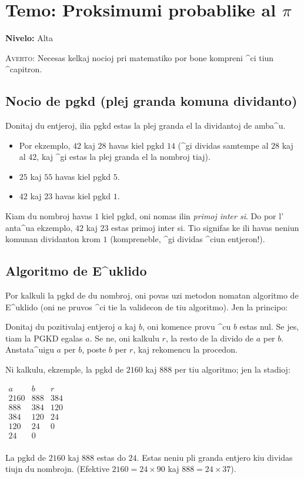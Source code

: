 \chapter{Temo: Proksimumi probablike al $\pi$}

{ }\hfill\textbf{Nivelo:} Alta

\textsc{Averto:} Necesas kelkaj nocioj pri matematiko por bone
kompreni ^ci tiun ^capitron.

\section{Nocio de pgkd (plej granda komuna dividanto)}

Donitaj du entjeroj, ilia pgkd estas la plej granda el la dividantoj
de amba^u.
\begin{itemize}
\item Por ekzemplo, $42$ kaj $28$ havas kiel pgkd $14$ (^gi dividas
  samtempe al $28$ kaj al $42$, kaj ^gi estas la plej granda el la
  nombroj tiaj).
\item $25$ kaj $55$ havas kiel pgkd $5$.
\item $42$ kaj $23$ havas kiel pgkd $1$.
\end{itemize}
Kiam du nombroj havas $1$ kiel pgkd, oni nomas ilin \emph{primoj inter
  si}.  Do por l' anta^ua ekzemplo, $42$ kaj $23$ estas primoj inter
si.  Tio signifas ke ili havas neniun komunan dividanton krom $1$
(kompreneble, ^gi dividas ^ciun entjeron!).

\section{Algoritmo de E^uklido}

Por kalkuli la pgkd de du nombroj, oni povas uzi metodon nomatan
algoritmo de E^uklido (oni ne pruvos ^ci tie la validecon de tiu
algoritmo).  Jen la principo:

Donitaj du pozitivalaj entjeroj $a$ kaj $b$, oni komence provu ^cu $b$
estas nul.  Se jes, tiam la PGKD egalas $a$.  Se ne, oni kalkulu $r$,
la resto de la divido de $a$ per $b$.  Anstata^uigu $a$ per $b$, poste
$b$ per $r$, kaj rekomencu la procedon.

Ni kalkulu, ekzemple, la pgkd de $2160$ kaj $888$ per tiu algoritmo;
jen la stadioj:
\begin{center}
$\begin{array}{ccc}
a & b & r\\
2160 & 888 & 384 \\
888 & 384 & 120 \\
384 & 120 & 24 \\
120 & 24 & 0 \\
24 & 0 & \\
\end{array}$
\end{center}
La pgkd de $2160$ kaj $888$ estas do $24$.  Estas neniu pli granda entjero kiu dividas tiujn du nombrojn.
(Efektive $2160=24\times90$ kaj $888=24\times37$).

